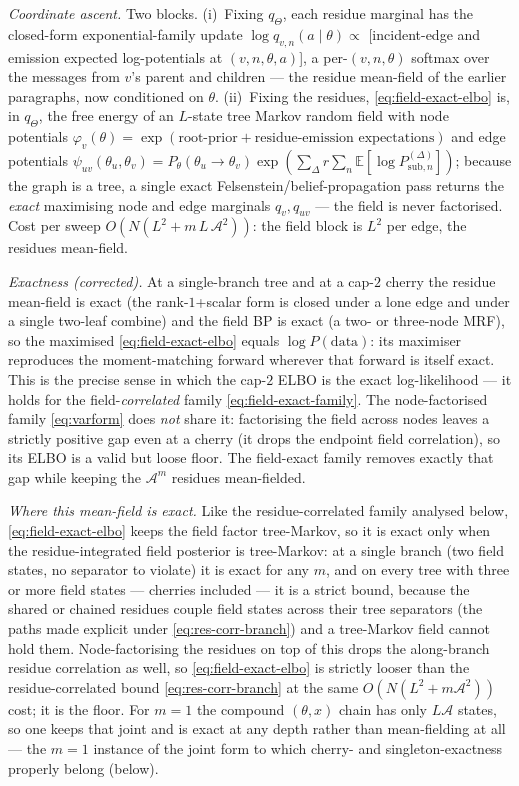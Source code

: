 \emph{Coordinate ascent.} Two blocks. (i)~Fixing $q_\Theta$, each residue
marginal has the closed-form exponential-family update
$\log q_{v,n}(a\mid\theta)\propto$ [incident-edge and emission expected
log-potentials at $(v,n,\theta,a)$], a per-$(v,n,\theta)$ softmax over the
messages from $v$'s parent and children --- the residue mean-field of the
earlier paragraphs, now conditioned on $\theta$. (ii)~Fixing the residues,
\eqref{eq:field-exact-elbo} is, in $q_\Theta$, the free energy of an $L$-state
tree Markov random field with node potentials
$\varphi_v(\theta)=\exp(\text{root-prior}+\text{residue-emission expectations})$
and edge potentials
$\psi_{uv}(\theta_u,\theta_v)=P_\theta(\theta_u\!\to\!\theta_v)
\exp(\sum_\Delta r\sum_n\mathbb{E}[\log P^{(\Delta)}_{\mathrm{sub},n}])$;
because the graph is a tree, a single exact Felsenstein/belief-propagation pass
returns the \emph{exact} maximising node and edge marginals $q_v,q_{uv}$ ---
the field is never factorised. Cost per sweep
$O(N(L^2 + m\,L\,\mathcal{A}^2))$: the field block is $L^2$ per edge, the
residues mean-field.

\emph{Exactness (corrected).} At a single-branch tree and at a cap-$2$ cherry
the residue mean-field is exact (the rank-$1$+scalar form is closed under a
lone edge and under a single two-leaf combine) and the field BP is exact (a
two- or three-node MRF), so the maximised \eqref{eq:field-exact-elbo} equals
$\log P(\mathrm{data})$: its maximiser reproduces the moment-matching forward
wherever that forward is itself exact. This is the precise sense in which the
cap-$2$ ELBO is the exact log-likelihood --- it holds for the
field-\emph{correlated} family \eqref{eq:field-exact-family}. The
node-factorised family \eqref{eq:varform} does \emph{not} share it: factorising
the field across nodes leaves a strictly positive gap even at a cherry (it
drops the endpoint field correlation), so its ELBO is a valid but loose floor.
The field-exact family removes exactly that gap while keeping the
$\mathcal{A}^m$ residues mean-fielded.

\emph{Where this mean-field is exact.} Like the residue-correlated family
analysed below, \eqref{eq:field-exact-elbo} keeps the field factor tree-Markov,
so it is exact only when the residue-integrated field posterior is tree-Markov:
at a single branch (two field states, no separator to violate) it is exact for
any $m$, and on every tree with three or more field states --- cherries included
--- it is a strict bound, because the shared or chained residues couple field
states across their tree separators (the paths made explicit under
\eqref{eq:res-corr-branch}) and a tree-Markov field cannot hold them.
Node-factorising the residues on top of this drops the along-branch residue
correlation as well, so \eqref{eq:field-exact-elbo} is strictly looser than the
residue-correlated bound \eqref{eq:res-corr-branch} at the same
$O(N(L^2+m\mathcal{A}^2))$ cost; it is the floor. For $m=1$ the compound
$(\theta,x)$ chain has only $L\mathcal{A}$ states, so one keeps that joint and is
exact at any depth rather than mean-fielding at all --- the $m=1$ instance of the
joint form to which cherry- and singleton-exactness properly belong (below).

